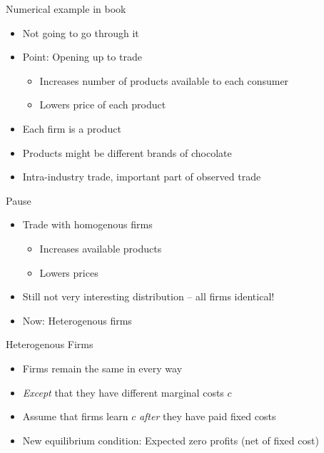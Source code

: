\documentclass[ignorenonframetext,]{beamer}
\begin{document}
\begin{frame}{Numerical example in book}
    
    \begin{itemize}
        \item Not going to go through it
        \item Point: Opening up to trade 
        \begin{itemize}
            \item Increases number of products available to each consumer
            \item Lowers price of each product
        \end{itemize}
        \item Each firm is a product
        \item Products might be different brands of chocolate 
        \item Intra-industry trade, important part of observed trade
    \end{itemize}

\end{frame}
    
\begin{frame}{Pause}

    \begin{itemize}
        \item Trade with homogenous firms
        \begin{itemize}
            \item Increases available products
            \item Lowers prices
        \end{itemize}
        \item Still not very interesting distribution -- all firms identical!
        \item Now: Heterogenous firms
    \end{itemize}

\end{frame}

\begin{frame}{Heterogenous Firms}

    \begin{itemize}
        \item Firms remain the same in every way
        \item \emph{Except} that they have different marginal costs $c$
        \item Assume that firms learn $c$ \emph{after} they have paid fixed costs 
        \item New equilibrium condition: Expected zero profits (net of fixed cost)
    \end{itemize}

\end{frame}
\end{document}

